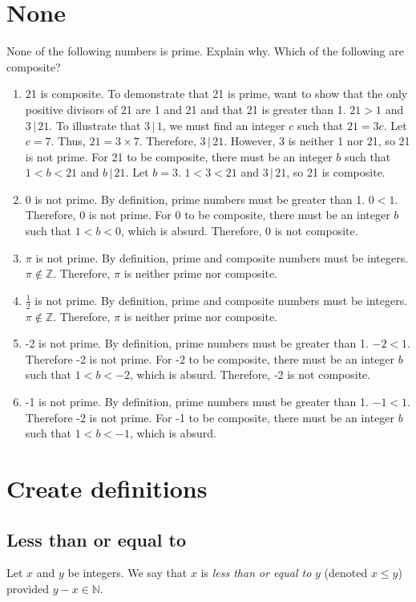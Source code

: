 \documentclass[12pt]{article}
\begin{document}
\section{None}
None of the following numbers is prime. Explain why. Which of the following are composite?
\begin{enumerate}
    \item 21 is composite. To demonstrate that 21 is prime, want to show that the only positive divisors of 21 are 1 and 21 and that 21 is greater than 1. $21>1$ and $3\,|\,21$. To illustrate that $3\,|\,1$, we must find an integer $c$ such that $21=3c$. Let $c=7$. Thus, $21=3\times 7$. Therefore, $3\,|\,21$. However, 3 is neither 1 nor 21, so 21 is not prime. For 21 to be composite, there must be an integer $b$ such that $1<b<21$ and $b\,|\,21$. Let $b=3$. $1<3<21$ and $3\,|\,21$, so 21 is composite.
    \item 0 is not prime. By definition, prime numbers must be greater than 1. $0<1$. Therefore, 0 is not prime. For 0 to be composite, there must be an integer $b$ such that $1<b<0$, which is absurd. Therefore, 0 is not composite.
    \item$\pi$ is not prime. By definition, prime and composite numbers must be integers. $\pi\notin\mathbb{Z}$. Therefore, $\pi$ is neither prime nor composite.
    \item$\frac{1}{2}$ is not prime. By definition, prime and composite numbers must be integers. $\pi\notin\mathbb{Z}$. Therefore, $\pi$ is neither prime nor composite.
    \item-2 is not prime. By definition, prime numbers must be greater than 1. $-2<1$. Therefore -2 is not prime. For -2 to be composite, there must be an integer $b$ such that $1<b<-2$, which is absurd. Therefore, -2 is not composite.
    \item-1 is not prime. By definition, prime numbers must be greater than 1. $-1<1$. Therefore -2 is not prime. For -1 to be composite, there must be an integer $b$ such that $1<b<-1$, which is absurd.
\end{enumerate}
\section{Create definitions}
\subsection{Less than or equal to}
Let $x$ and $y$ be integers. We say that $x$ is \textit{less than or equal to} $y$ (denoted $x\leq y$) provided $y-x\in\mathbb{N}$.
\end{document}
